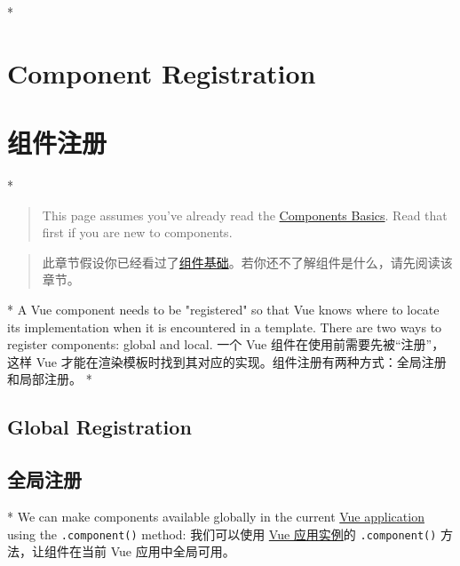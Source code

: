 \begin{paracol}{2}

\switchcolumn[0]*%
\section{Component Registration}
\switchcolumn
\section{组件注册}
\switchcolumn[0]*%
\begin{quote}
This page assumes you've already read the
\href{https://vuejs.org/guide/essentials/component-basics.html}{Components
Basics}. Read that first if you are new to components.
\end{quote}
\switchcolumn
\begin{quote}
此章节假设你已经看过了\href{https://cn.vuejs.org/guide/essentials/component-basics.html}{组件基础}。若你还不了解组件是什么，请先阅读该章节。
\end{quote}
\switchcolumn[0]*%
A Vue component needs to be "registered" so that Vue knows where to
locate its implementation when it is encountered in a template. There
are two ways to register components: global and local.
\switchcolumn
一个 Vue 组件在使用前需要先被``注册''，这样 Vue
才能在渲染模板时找到其对应的实现。组件注册有两种方式：全局注册和局部注册。
\switchcolumn[0]*%
\subsection{Global Registration}
\switchcolumn
\subsection{全局注册}
\switchcolumn[0]*%
We can make components available globally in the current
\href{https://vuejs.org/guide/essentials/application.html}{Vue
application} using the \texttt{.component()} method:
\switchcolumn
我们可以使用
\href{https://cn.vuejs.org/guide/essentials/application.html}{Vue
应用实例}的 \texttt{.component()} 方法，让组件在当前 Vue
应用中全局可用。



\end{paracol}
